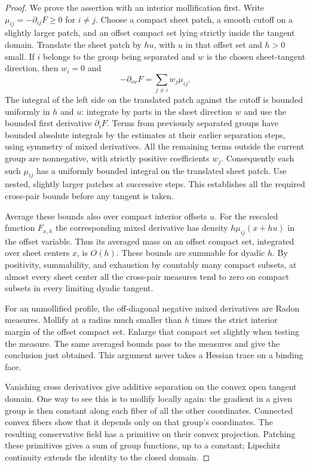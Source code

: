 \begin{proof}
We prove the assertion with an interior mollification first.  Write
$\mu_{ij}=-\partial_{ij}F\geq0$ for $i\ne j$.
Choose a compact sheet patch, a smooth cutoff on a slightly larger
patch, and an offset compact set lying strictly inside the tangent
domain.  Translate the sheet patch by $hu$, with $u$ in that
offset set and $h>0$ small.  If $i$ belongs to the group being
separated and $w$ is the chosen sheet-tangent direction, then
$w_i=0$ and
\[
-\partial_{iw}F=\sum_{j\ne i}w_j\mu_{ij}.
\]
The integral of the left side on the translated patch against
the cutoff is bounded uniformly in $h$ and $u$: integrate by
parts in the sheet direction $w$ and use the bounded first
derivative $\partial_iF$.  Terms from previously separated
groups have bounded absolute integrals by the estimates at their
earlier separation steps, using symmetry of mixed derivatives.
All the remaining terms outside the current group are
nonnegative, with strictly positive coefficients $w_j$.
Consequently each such $\mu_{ij}$ has a uniformly bounded
integral on the translated sheet patch.  Use nested, slightly
larger patches at successive steps.  This establishes all the
required cross-pair bounds before any tangent is taken.

Average these bounds also over compact interior offsets $u$.
For the rescaled function $F_{x,h}$ the corresponding mixed
derivative has density $h\mu_{ij}(x+hu)$ in the offset variable.
Thus its averaged mass on an offset compact set, integrated over
sheet centers $x$, is $O(h)$.  These bounds are summable for
dyadic $h$.  By positivity, summability, and exhaustion by
countably many compact subsets, at almost every sheet center all
the cross-pair measures tend to zero on compact subsets in every
limiting dyadic tangent.

For an unmollified profile, the off-diagonal negative mixed
derivatives are Radon measures.  Mollify at a radius much smaller
than $h$ times the strict interior margin of the offset compact
set.  Enlarge that compact set slightly when testing the measure.
The same averaged bounds pass to the measures and give the
conclusion just obtained.  This argument never takes a Hessian
trace on a binding face.

Vanishing cross derivatives give additive separation on the
convex open tangent domain.  One way to see this is to mollify
locally again: the gradient in a given group is then constant
along each fiber of all the other coordinates.  Connected
convex fibers show that it depends only on that group's
coordinates.  The resulting conservative field has a primitive
on their convex projection.  Patching these primitives gives a
sum of group functions, up to a constant; Lipschitz continuity
extends the identity to the closed domain.


\end{proof}
